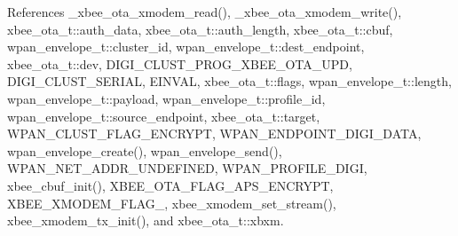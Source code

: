 References \-\_\-xbee\-\_\-ota\-\_\-xmodem\-\_\-read(), \-\_\-xbee\-\_\-ota\-\_\-xmodem\-\_\-write(), xbee\-\_\-ota\-\_\-t\-::auth\-\_\-data, xbee\-\_\-ota\-\_\-t\-::auth\-\_\-length, xbee\-\_\-ota\-\_\-t\-::cbuf, wpan\-\_\-envelope\-\_\-t\-::cluster\-\_\-id, wpan\-\_\-envelope\-\_\-t\-::dest\-\_\-endpoint, xbee\-\_\-ota\-\_\-t\-::dev, D\-I\-G\-I\-\_\-\-C\-L\-U\-S\-T\-\_\-\-P\-R\-O\-G\-\_\-\-X\-B\-E\-E\-\_\-\-O\-T\-A\-\_\-\-U\-P\-D, D\-I\-G\-I\-\_\-\-C\-L\-U\-S\-T\-\_\-\-S\-E\-R\-I\-A\-L, E\-I\-N\-V\-A\-L, xbee\-\_\-ota\-\_\-t\-::flags, wpan\-\_\-envelope\-\_\-t\-::length, wpan\-\_\-envelope\-\_\-t\-::payload, wpan\-\_\-envelope\-\_\-t\-::profile\-\_\-id, wpan\-\_\-envelope\-\_\-t\-::source\-\_\-endpoint, xbee\-\_\-ota\-\_\-t\-::target, W\-P\-A\-N\-\_\-\-C\-L\-U\-S\-T\-\_\-\-F\-L\-A\-G\-\_\-\-E\-N\-C\-R\-Y\-P\-T, W\-P\-A\-N\-\_\-\-E\-N\-D\-P\-O\-I\-N\-T\-\_\-\-D\-I\-G\-I\-\_\-\-D\-A\-T\-A, wpan\-\_\-envelope\-\_\-create(), wpan\-\_\-envelope\-\_\-send(), W\-P\-A\-N\-\_\-\-N\-E\-T\-\_\-\-A\-D\-D\-R\-\_\-\-U\-N\-D\-E\-F\-I\-N\-E\-D, W\-P\-A\-N\-\_\-\-P\-R\-O\-F\-I\-L\-E\-\_\-\-D\-I\-G\-I, xbee\-\_\-cbuf\-\_\-init(), X\-B\-E\-E\-\_\-\-O\-T\-A\-\_\-\-F\-L\-A\-G\-\_\-\-A\-P\-S\-\_\-\-E\-N\-C\-R\-Y\-P\-T, X\-B\-E\-E\-\_\-\-X\-M\-O\-D\-E\-M\-\_\-\-F\-L\-A\-G\-\_, xbee\-\_\-xmodem\-\_\-set\-\_\-stream(), xbee\-\_\-xmodem\-\_\-tx\-\_\-init(), and xbee\-\_\-ota\-\_\-t\-::xbxm.

